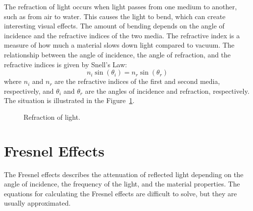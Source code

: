 The refraction of light occurs when light passes from one medium to another, such as from air to water. This causes the light to bend, which can create interesting visual effects. The amount of bending depends on the angle of incidence and the refractive indices of the two media. The refractive index is a measure of how much a material slows down light compared to vacuum. The relationship between the angle of incidence, the angle of refraction, and the refractive indices is given by Snell's Law:
\begin{equation*}
    n_i \sin(\theta_i) = n_r \sin(\theta_r)
\end{equation*}
where $n_i$ and $n_r$ are the refractive indices of the first and second media, respectively, and $\theta_i$ and $\theta_r$ are the angles of incidence and refraction, respectively. The situation is illustrated in the Figure~\ref{fig:refraction}.
\begin{figure}
    \centering
    \caption{Refraction of light.}
    \label{fig:refraction}
\end{figure}

\section{Fresnel Effects}

The Fresnel effects describes the attenuation of reflected light depending on the angle of incidence, the frequency of the light, and the material properties. The equations for calculating the Fresnel effects are difficult to solve, but they are usually approximated.